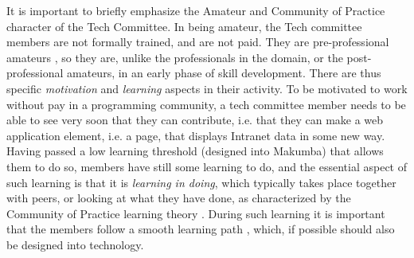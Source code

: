 \documentclass{llncs}
\begin{document}
It is important to briefly emphasize the Amateur \cite{bogdan03} and Community of Practice character \cite{lave_wenger91} of the Tech Committee. In being amateur, the Tech committee members are not formally trained, and are not paid. They are pre-professional amateurs \cite{stebbins79}, so they are, unlike the professionals in the domain, or the post-professional amateurs, in an early phase of skill development. There are thus specific \textit{motivation} and \textit{learning} aspects  in their activity. To be motivated to work without pay in a programming community, a tech committee member needs to be able to see very soon that they can contribute, i.e. that they can make a web application element, i.e. a page, that displays Intranet data in some new way. Having passed a low learning threshold (designed into Makumba) that allows them to do so, members have still some learning to do, and the essential aspect of such learning is that it is \textit {learning in doing}, which typically takes place together with peers, or looking at what they have done, as characterized by the Community of Practice learning theory  \cite{lave_wenger91}. During such learning it is important that the members follow a smooth learning path \cite{bogdan_bowers07}, which, if possible should also be designed into technology.



\end{document}
